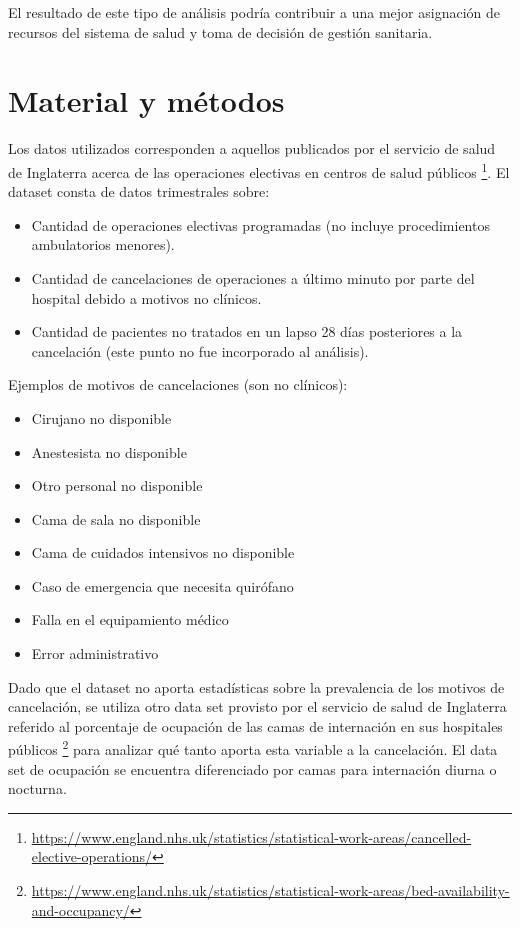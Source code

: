\documentclass[
]{article}
\providecommand{\tightlist}{%
  \setlength{\itemsep}{0pt}\setlength{\parskip}{0pt}}
\begin{document}
El resultado de este tipo de análisis podría contribuir a una mejor
asignación de recursos del sistema de salud y toma de decisión de
gestión sanitaria.

\hypertarget{material-y-muxe9todos}{%
\section{Material y métodos}\label{material-y-muxe9todos}}

Los datos utilizados corresponden a aquellos publicados por el servicio
de salud de Inglaterra acerca de las operaciones electivas en centros de
salud públicos \footnote{\url{https://www.england.nhs.uk/statistics/statistical-work-areas/cancelled-elective-operations/}}.
El dataset consta de datos trimestrales sobre:

\begin{itemize}
\tightlist
\item
  Cantidad de operaciones electivas programadas (no incluye
  procedimientos ambulatorios menores).
\item
  Cantidad de cancelaciones de operaciones a último minuto por parte del
  hospital debido a motivos no clínicos.
\item
  Cantidad de pacientes no tratados en un lapso 28 días posteriores a la
  cancelación (este punto no fue incorporado al análisis).
\end{itemize}

Ejemplos de motivos de cancelaciones (son no clínicos):

\begin{itemize}
\tightlist
\item
  Cirujano no disponible
\item
  Anestesista no disponible
\item
  Otro personal no disponible
\item
  Cama de sala no disponible
\item
  Cama de cuidados intensivos no disponible
\item
  Caso de emergencia que necesita quirófano
\item
  Falla en el equipamiento médico
\item
  Error administrativo
\end{itemize}

Dado que el dataset no aporta estadísticas sobre la prevalencia de los
motivos de cancelación, se utiliza otro data set provisto por el
servicio de salud de Inglaterra referido al porcentaje de ocupación de
las camas de internación en sus hospitales públicos \footnote{\url{https://www.england.nhs.uk/statistics/statistical-work-areas/bed-availability-and-occupancy/}}
para analizar qué tanto aporta esta variable a la cancelación. El data
set de ocupación se encuentra diferenciado por camas para internación
diurna o nocturna.
\end{document}
